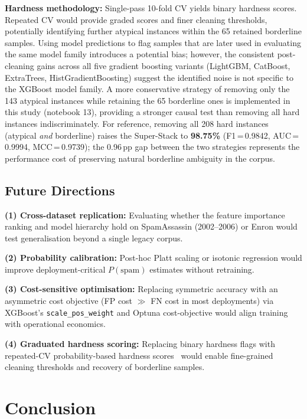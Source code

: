 \documentclass[conference]{IEEEtran}
\begin{document}
\textbf{Hardness methodology:} Single-pass 10-fold CV yields
binary hardness scores. Repeated CV would provide graded scores
and finer cleaning thresholds, potentially identifying further
atypical instances within the 65 retained borderline samples.
Using model predictions to flag samples that are later used in
evaluating the same model family introduces a potential bias;
however, the consistent post-cleaning gains across all five
gradient boosting variants (LightGBM, CatBoost, ExtraTrees,
HistGradientBoosting) suggest the identified noise is not
specific to the XGBoost model family. A more conservative
strategy of removing only the 143 atypical instances
while retaining the 65 borderline ones is implemented
in this study (notebook 13), providing a stronger causal
test than removing all hard instances indiscriminately.
For reference, removing all 208 hard instances (atypical
\emph{and} borderline) raises the Super-Stack to
\textbf{98.75\%} (F1\,=\,0.9842, AUC\,=\,0.9994,
MCC\,=\,0.9739); the 0.96\,pp gap between the two
strategies represents the performance cost of preserving
natural borderline ambiguity in the corpus.

\subsection{Future Directions}

\textbf{(1) Cross-dataset replication:} Evaluating whether
the feature importance ranking and model hierarchy hold on
SpamAssassin (2002--2006) or Enron would test generalisation
beyond a single legacy corpus.

\textbf{(2) Probability calibration:} Post-hoc Platt scaling
or isotonic regression would improve deployment-critical
$P(\text{spam})$ estimates without retraining.

\textbf{(3) Cost-sensitive optimisation:} Replacing symmetric
accuracy with an asymmetric cost objective (FP cost $\gg$ FN
cost in most deployments) via XGBoost's \texttt{scale\_pos\_weight}
and Optuna cost-objective would align training with operational
economics.

\textbf{(4) Graduated hardness scoring:} Replacing binary
hardness flags with repeated-CV probability-based hardness
scores~\cite{ref15} would enable fine-grained cleaning
thresholds and recovery of borderline samples.

\section{Conclusion}
\end{document}
